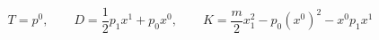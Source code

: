 \begin{equation}
T=p^0,\qquad D=\frac{1}{2}p_1x^1+p_0x^0,\qquad
K=\frac{m}{2}x_1^2-p_0(x^0)^2-x^0p_1x^1
\label{integ}
\end{equation}

